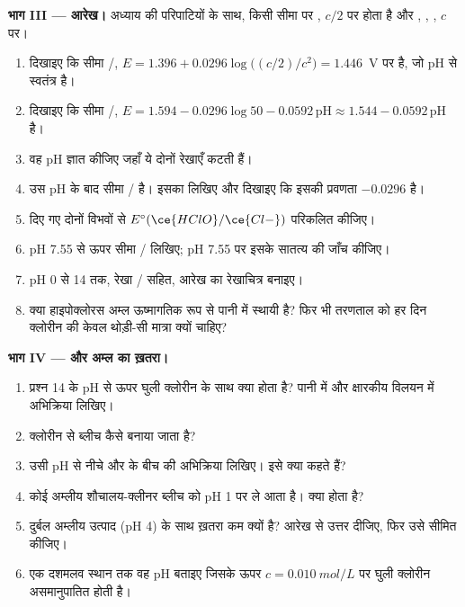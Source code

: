 \begin{problem}
\medskip
\noindent\textbf{भाग III --- आरेख।}
अध्याय की परिपाटियों के साथ, किसी सीमा पर , $c/2$ पर होता है और
, , , $c$ पर।
\begin{enumerate}[resume]
  \item दिखाइए कि सीमा /, $E = 1.396 +
        0.0296\log\bigl((c/2)/c^2\bigr) = 1.446$~V पर है, जो pH से स्वतंत्र है।
  \item दिखाइए कि सीमा /, $E = 1.594 -
        0.0296\log 50 - 0.0592\,\mathrm{pH} \approx 1.544 -
        0.0592\,\mathrm{pH}$ है।
  \item वह pH ज्ञात कीजिए जहाँ ये दोनों रेखाएँ कटती हैं।
  \item उस pH के बाद सीमा / है। इसका
         लिखिए और दिखाइए कि इसकी प्रवणता $-0.0296$ है।
  \item दिए गए दोनों विभवों से $E^\circ(\ce{HClO}/\ce{Cl-})$ परिकलित कीजिए।
  \item pH 7.55 से ऊपर सीमा / लिखिए; pH 7.55 पर
        इसके सातत्य की जाँच कीजिए।
  \item pH 0 से 14 तक, रेखा / सहित, आरेख का रेखाचित्र बनाइए।
  \item क्या हाइपोक्लोरस अम्ल ऊष्मागतिक रूप से पानी में स्थायी है? फिर भी तरणताल
        को हर दिन क्लोरीन की केवल थोड़ी-सी मात्रा क्यों चाहिए?
\end{enumerate}

\medskip
\noindent\textbf{भाग IV ---  और अम्ल का ख़तरा।}
\begin{enumerate}[resume]
  \item प्रश्न 14 के pH से ऊपर घुली क्लोरीन के साथ क्या होता है?
        पानी में और क्षारकीय विलयन में अभिक्रिया लिखिए।
  \item क्लोरीन से ब्लीच कैसे बनाया जाता है?
  \item उसी pH से नीचे  और
         के बीच की अभिक्रिया लिखिए। इसे क्या कहते हैं?
  \item कोई अम्लीय शौचालय-क्लीनर ब्लीच को pH 1 पर ले आता है। क्या होता है?
  \item दुर्बल अम्लीय उत्पाद (pH 4) के साथ ख़तरा कम क्यों है?
        आरेख से उत्तर दीजिए, फिर उसे सीमित कीजिए।
  \item एक दशमलव स्थान तक वह pH बताइए जिसके ऊपर $c = \qty{0.010}{mol/L}$ पर घुली क्लोरीन
        असमानुपातित होती है।
\end{enumerate}
\end{problem}
